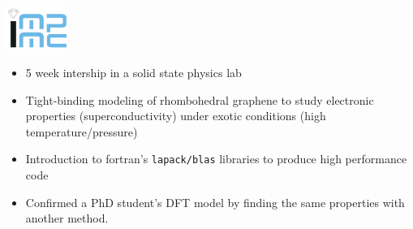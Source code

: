 \noindent
\begin{minipage}{.15\textwidth}
    \centerline{\includegraphics[width=20mm]{img/impmc}}
\end{minipage}%
\hspace{5mm}
\begin{minipage}{.8\textwidth}
    \raggedright
    \begin{itemize}
	\item 5 week intership in a solid state physics lab
	\item Tight-binding modeling of rhombohedral graphene to study electronic properties (superconductivity) under exotic conditions (high temperature/pressure)
	\item Introduction to fortran's \texttt{lapack/blas} libraries to produce high performance code
	\item Confirmed a PhD student's DFT model by finding the same properties with another method.
    \end{itemize}
\end{minipage}

